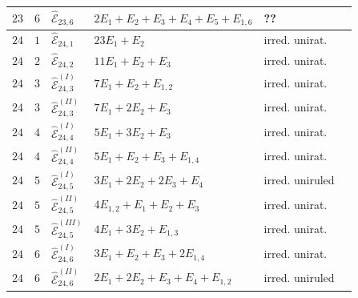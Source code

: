 \documentclass[11pt]{amsart}
\theoremstyle{definition}
\def\E{{\mathcal E}}
\begin{document}
\begin{minipage}[t]{\textwidth/2-1mm}
{\begin{tabular}{ |l | l |l|l|l|l|}
$23$ & $6$ & $\widehat{\E}_{23,6}$ & $2E_1+E_2+E_3+E_4+E_5+E_{1,6}$ & ?? \\\hline\hline

$24$ & $1$ & $\widehat{\E}_{24,1}$ & $23E_1+E_2$ & irred. unirat. \\\hline
$24$ & $2$ & $\widehat{\E}_{24,2}$ & $11E_1+E_2+E_3$ & irred. unirat. \\\hline
$24$ & $3$ & $\widehat{\E}_{24,3}^{(I)}$ & $7E_1+E_2+E_{1,2}$ & irred. unirat. \\
$24$ & $3$ & $\widehat{\E}_{24,3}^{(II)}$ & $7E_1+2E_2+E_3$ & irred. unirat. \\\hline

$24$ & $4$ & $\widehat{\E}_{24,4}^{(I)}$ & $5E_1+3E_2+E_3$ & irred. unirat.\\
$24$ & $4$ & $\widehat{\E}_{24,4}^{(II)}$ & $5E_1+E_2+E_3+E_{1,4}$  & irred. unirat.\\\hline 

$24$ & $5$ & $\widehat{\E}_{24,5}^{(I)}$ & $3E_1+2E_2+2E_3+E_4$ & irred. uniruled \\
$24$ & $5$ & $\widehat{\E}_{24,5}^{(II)}$ & $4E_{1,2}+E_1+E_2+E_3$  & irred. unirat.\\
$24$ & $5$ & $\widehat{\E}_{24,5}^{(III)}$ & $4E_1+3E_2+E_{1,3}$  & irred. unirat.\\\hline 
$24$ & $6$ & $\widehat{\E}_{24,6}^{(I)}$ & $3E_1+E_2+E_3+2E_{1,4}$  & irred. unirat.\\
$24$ & $6$ & $\widehat{\E}_{24,6}^{(II)}$ & $2E_1+2E_2+E_3+E_4+E_{1,2}$  & irred. uniruled \\\hline\hline 


\end{tabular}}
\end{minipage}
\end{document}
